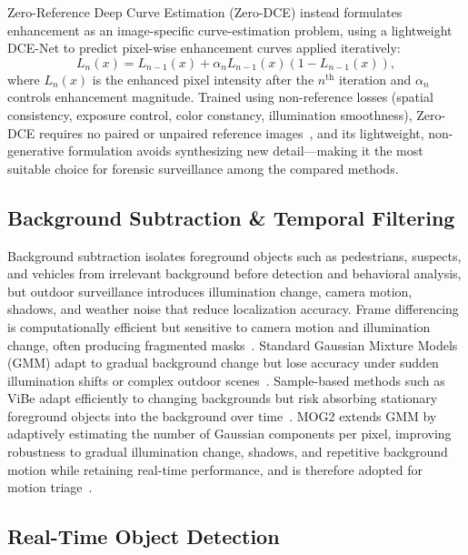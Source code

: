 \documentclass[runningheads]{llncs}
\begin{document}
Zero-Reference Deep Curve Estimation (Zero-DCE) instead formulates
enhancement as an image-specific curve-estimation problem, using a
lightweight DCE-Net to predict pixel-wise enhancement curves applied
iteratively:
\begin{equation}
L_{n}(x)=L_{n-1}(x)+\alpha_{n}L_{n-1}(x)
\left(1-L_{n-1}(x)\right),
\label{eq:zerodce}
\end{equation}
where $L_n(x)$ is the enhanced pixel intensity after the
$n^{\text{th}}$ iteration and $\alpha_n$ controls enhancement
magnitude. Trained using non-reference losses (spatial consistency,
exposure control, color constancy, illumination smoothness), Zero-DCE
requires no paired or unpaired reference images~\cite{zerodce}, and its
lightweight, non-generative formulation avoids synthesizing new
detail—making it the most suitable choice for forensic surveillance
among the compared methods.


\subsection{Background Subtraction \& Temporal Filtering}

Background subtraction isolates foreground objects such as pedestrians, suspects, and vehicles from irrelevant background before detection and behavioral analysis, but outdoor surveillance introduces illumination change, camera motion, shadows, and weather noise that reduce localization accuracy. Frame differencing is computationally efficient but sensitive to camera motion and illumination change, often producing fragmented masks~\cite{framediff}. Standard Gaussian Mixture Models (GMM) adapt to gradual background change but lose accuracy under sudden illumination shifts or complex outdoor scenes~\cite{gmm}. Sample-based methods such as ViBe adapt efficiently to changing backgrounds but risk absorbing stationary foreground objects into the background over time~\cite{vibe}. MOG2 extends GMM by adaptively estimating the number of Gaussian components per pixel, improving robustness to gradual illumination change, shadows, and repetitive background motion while retaining real-time performance, and is therefore adopted for motion triage~\cite{zivkovic2004mog2}.


\subsection{Real-Time Object Detection}
\end{document}
